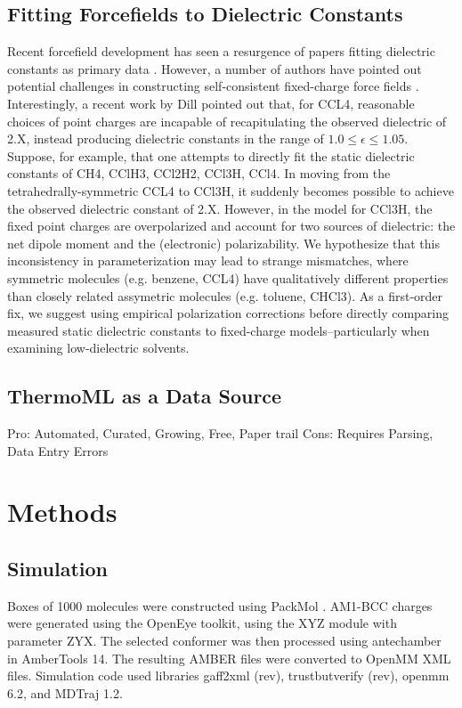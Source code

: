 \documentclass[aps,pre,twocolumn,superscriptaddress]{revtex4-1}
\begin{document}
\subsection{Fitting Forcefields to Dielectric Constants}

Recent forcefield development has seen a resurgence of papers fitting dielectric constants as primary data \cite{leeping, mobley}.  However, a number of authors have pointed out potential challenges in constructing self-consistent fixed-charge force fields \cite{davisguy}.  Interestingly, a recent work by Dill \cite{fennell2012simple} pointed out that, for CCL4, reasonable choices of point charges are incapable of recapitulating the observed dielectric of 2.X, instead producing dielectric constants in the range of $1.0 \le \epsilon \le 1.05$.  Suppose, for example, that one attempts to directly fit the static dielectric constants of CH4, CClH3, CCl2H2, CCl3H, CCl4.  In moving from the tetrahedrally-symmetric CCL4 to CCl3H, it suddenly becomes possible to achieve the observed dielectric constant of 2.X.  However, in the model for CCl3H, the fixed point charges are overpolarized and account for two sources of dielectric: the net dipole moment and the (electronic) polarizability.  We hypothesize that this inconsistency in parameterization may lead to strange mismatches, where symmetric molecules (e.g. benzene, CCL4) have qualitatively different properties than closely related assymetric molecules (e.g. toluene, CHCl3).  As a first-order fix, we suggest using empirical polarization corrections before directly comparing measured static dielectric constants to fixed-charge models--particularly when examining low-dielectric solvents.


\subsection{ThermoML as a Data Source}

Pro: Automated, Curated, Growing, Free, Paper trail
Cons: Requires Parsing, Data Entry Errors

\section{Methods}

\subsection{Simulation}
Boxes of 1000 molecules were constructed using PackMol \cite{}.  AM1-BCC charges were generated using the OpenEye toolkit, using the XYZ module with parameter ZYX.  The selected conformer was then processed using antechamber in AmberTools 14.  The resulting AMBER files were converted to OpenMM \cite{} XML files.  Simulation code used libraries gaff2xml (rev), trustbutverify (rev), openmm 6.2, and MDTraj \cite{} 1.2.  
\end{document}
